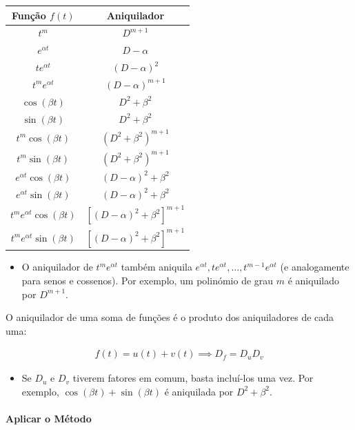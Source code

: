 \documentclass{article}
\begin{document}
\begin{center}
\renewcommand{\arraystretch}{1.3}
\begin{tabular}{|c|c|}
\hline
Função $f(t)$ & Aniquilador \\
\hline
$t^m$ & $D^{m+1}$ \\
$e^{\alpha t}$ & $D - \alpha$ \\
$t e^{\alpha t}$ & $(D - \alpha)^2$ \\
$t^m e^{\alpha t}$ & $(D - \alpha)^{m+1}$ \\
$\cos(\beta t)$ & $D^2 + \beta^2$ \\
$\sin(\beta t)$ & $D^2 + \beta^2$ \\
$t^m \cos(\beta t)$ & $(D^2 + \beta^2)^{m+1}$ \\
$t^m \sin(\beta t)$ & $(D^2 + \beta^2)^{m+1}$ \\
$e^{\alpha t} \cos(\beta t)$ & $(D - \alpha)^2 + \beta^2$ \\
$e^{\alpha t} \sin(\beta t)$ & $(D - \alpha)^2 + \beta^2$ \\
$t^m e^{\alpha t} \cos(\beta t)$ & $\left[ (D - \alpha)^2 + \beta^2 \right]^{m+1}$ \\
$t^m e^{\alpha t} \sin(\beta t)$ & $\left[ (D - \alpha)^2 + \beta^2 \right]^{m+1}$ \\
\hline
\end{tabular}
\end{center}

\begin{itemize}
    \item O aniquilador de $t^m e^{\alpha t}$ também aniquila $e^{\alpha t}, t e^{\alpha t}, \ldots,
    t^{m-1} e^{\alpha t}$ (e analogamente para senos e cossenos).
    Por exemplo, um polinómio de grau $m$ é aniquilado por $D^{m+1}$.
\end{itemize}

O aniquilador de uma soma de funções é o produto dos aniquiladores de cada uma:

\begin{gather*}
f(t) = u(t) + v(t) \implies D_f = D_u D_v
\end{gather*}

\begin{itemize}
    \item Se $D_u$ e $D_v$ tiverem fatores em comum, basta incluí-los uma vez. Por exemplo,
    $\cos(\beta t) + \sin(\beta t)$ é aniquilada por $D^2 + \beta^2$.
\end{itemize}

\paragraph{Aplicar o Método}
\end{document}
